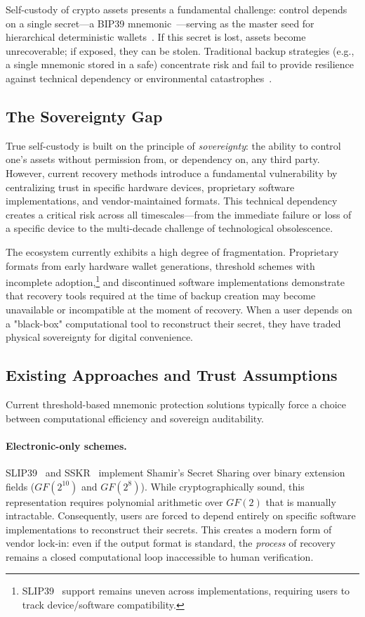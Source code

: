 \documentclass[11pt]{article}
\begin{document}
Self-custody of crypto assets presents a fundamental challenge: control depends on a single secret---a BIP39 mnemonic~\cite{bip39}---serving as the master seed for hierarchical deterministic wallets~\cite{bip32}. If this secret is lost, assets become unrecoverable; if exposed, they can be stolen. Traditional backup strategies (e.g., a single mnemonic stored in a safe) concentrate risk and fail to provide resilience against technical dependency or environmental catastrophes~\cite{eskandari2015}.

\subsection{The Sovereignty Gap}

True self-custody is built on the principle of \textit{sovereignty}: the ability to control one's assets without permission from, or dependency on, any third party. However, current recovery methods introduce a fundamental vulnerability by centralizing trust in specific hardware devices, proprietary software implementations, and vendor-maintained formats. This technical dependency creates a critical risk across all timescales---from the immediate failure or loss of a specific device to the multi-decade challenge of technological obsolescence.

The ecosystem currently exhibits a high degree of fragmentation. Proprietary formats from early hardware wallet generations, threshold schemes with incomplete adoption,\footnote{SLIP39~\cite{slip39} support remains uneven across implementations, requiring users to track device/software compatibility.} and discontinued software implementations demonstrate that recovery tools required at the time of backup creation may become unavailable or incompatible at the moment of recovery. When a user depends on a "black-box" computational tool to reconstruct their secret, they have traded physical sovereignty for digital convenience.

\subsection{Existing Approaches and Trust Assumptions}

Current threshold-based mnemonic protection solutions typically force a choice between computational efficiency and sovereign auditability.

\paragraph{Electronic-only schemes.} SLIP39~\cite{slip39} and SSKR~\cite{sskr} implement Shamir's Secret Sharing over binary extension fields ($GF(2^{10})$ and $GF(2^8)$). While cryptographically sound, this representation requires polynomial arithmetic over $GF(2)$ that is manually intractable. Consequently, users are forced to depend entirely on specific software implementations to reconstruct their secrets. This creates a modern form of vendor lock-in: even if the output format is standard, the \textit{process} of recovery remains a closed computational loop inaccessible to human verification.
\end{document}
